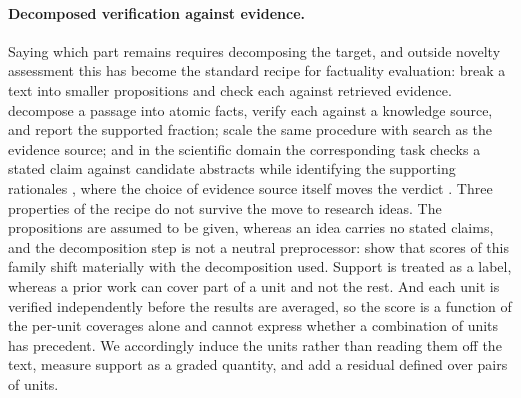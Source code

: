 \paragraph{Decomposed verification against evidence.} Saying which part remains
requires decomposing the target, and outside novelty assessment this has become
the standard recipe for factuality evaluation: break a text into smaller
propositions and check each against retrieved evidence.
\citet{min2023factscore} decompose a passage into atomic facts, verify each
against a knowledge source, and report the supported fraction;
\citet{wei2024safe} scale the same procedure with search as the evidence source;
and in the scientific domain the corresponding task checks a stated claim
against candidate abstracts while identifying the supporting rationales
\citep{wadden2020scifact,wadden2022multivers}, where the choice of evidence
source itself moves the verdict \citep{vladika2024knowledge}. Three properties of the recipe do
not survive the move to research ideas. The propositions are assumed to be
given, whereas an idea carries no stated claims, and the decomposition step is
not a neutral preprocessor: \citet{wanner2024decomposition} show that scores of
this family shift materially with the decomposition used. Support is treated as
a label, whereas a prior work can cover part of a unit and not the rest. And
each unit is verified independently before the results are averaged, so the
score is a function of the per-unit coverages alone and cannot express whether
a combination of units has precedent. We accordingly induce the units rather
than reading them off the text, measure support as a graded quantity, and add a
residual defined over pairs of units.
